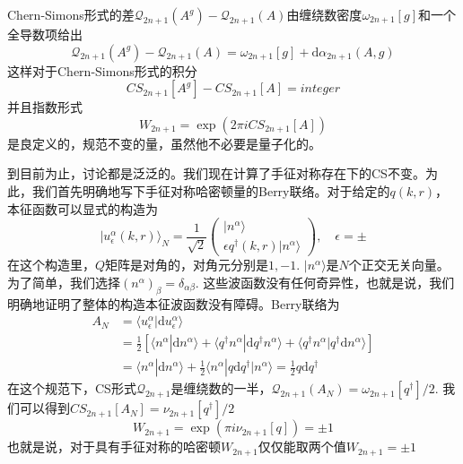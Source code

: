 \documentclass{article}
\numberwithin{equation}{subsection}
\begin{document}
Chern-Simons形式的差$\mathcal{Q}_{2n+1}(A^g)-\mathcal{Q}_{2n+1}(A)$由缠绕数密度$\omega_{2n+1}[g]$和一个全导数项给出
\begin{equation}
    \mathcal{Q}_{2n+1}(A^g)-\mathcal{Q}_{2n+1}(A)=\omega_{2n+1}[g]+\mathrm{d}\alpha_{2n+1}(A,g)
\end{equation}
这样对于Chern-Simons形式的积分
\begin{equation}\label{CS integer}
    CS_{2n+1}[A^g]-CS_{2n+1}[A]=integer
\end{equation}
并且指数形式
\begin{equation}
    W_{2n+1}=\exp(2\pi i CS_{2n+1}[A])
\end{equation}
是良定义的，规范不变的量，虽然他不必要是量子化的。

到目前为止，讨论都是泛泛的。我们现在计算了手征对称存在下的CS不变。为此，我们首先明确地写下手征对称哈密顿量的Berry联络。对于给定的$q(k,r)$，本征函数可以显式的构造为
\begin{equation}
    |u^\alpha_\epsilon(k,r)\rangle_N=\frac{1}{\sqrt{2}}\begin{pmatrix}
        |n^\alpha\rangle\\
        \epsilon q^\dagger(k,r)|n^\alpha\rangle
    \end{pmatrix},\quad \epsilon=\pm
\end{equation}
在这个构造里，$Q$矩阵是对角的，对角元分别是$1,-1$. $|n^\alpha\rangle$是$N$个正交无关向量。为了简单，我们选择$(n^\alpha)_\beta=\delta_{\alpha\beta}$. 这些波函数没有任何奇异性，也就是说，我们明确地证明了整体的构造本征波函数没有障碍。Berry联络为
\begin{equation}
    \begin{split}
        A_N&=\langle u_\epsilon^\alpha|\mathrm{d}u_\epsilon^\alpha\rangle\\
        &=\frac{1}{2}\left[\langle n^\alpha|\mathrm{d}n^\alpha\rangle+\langle q^\dagger n^\alpha|\mathrm{d}q^\dagger n^\alpha\rangle+\langle q^\dagger n^\alpha|q^\dagger \mathrm{d}n^\alpha\rangle\right]\\
        &=\langle n^\alpha|\mathrm{d}n^\alpha\rangle+\frac{1}{2}\langle n^\alpha|q\mathrm{d}q^\dagger|n^\alpha\rangle=\frac{1}{2}q\mathrm{d}q^\dagger
    \end{split}
\end{equation}
在这个规范下，CS形式$\mathcal{Q}_{2n+1}$是缠绕数的一半，$\mathcal{Q}_{2n+1}(A_N)=\omega_{2n+1}[q^\dagger]/2$. 我们可以得到$CS_{2n+1}[A_N]=\nu_{2n+1}[q^\dagger]/2$
\begin{equation}
    W_{2n+1}=\exp(\pi i\nu_{2n+1}[q])=\pm 1
\end{equation}
也就是说，对于具有手征对称的哈密顿$W_{2n+1}$仅仅能取两个值$W_{2n+1}=\pm 1$
\end{document}

